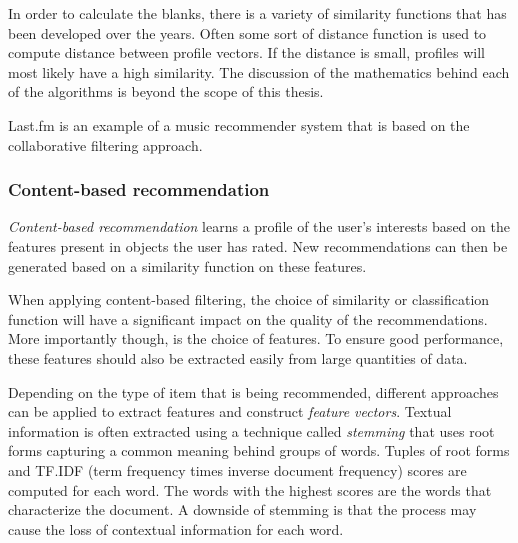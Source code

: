 In order to calculate the blanks, there is a variety of similarity functions that has been developed over the years. Often some sort of distance function is used to compute distance between profile vectors. If the distance is small, profiles will most likely have a high similarity\cite{rajaraman:2012}. The discussion of the mathematics behind each of the algorithms is beyond the scope of this thesis.

Last.fm is an example of a music recommender system that is based on the collaborative filtering approach\cite{levy:2010}.


\subsubsection{Content-based recommendation}\label{chapter:literature_study:section:computer:subsection:algorithms:subsubsection:cbf}

\emph{Content-based recommendation} learns a profile of the user's interests based on the features present in objects the user has rated. New recommendations can then be generated based on a similarity function on these features\cite{burke:2002, pazzani:2007:CRS:1768197.1768209}.

When applying content-based filtering, the choice of similarity or classification function will have a significant impact on the quality of the recommendations. More importantly though, is the choice of features. To ensure good performance, these features should also be extracted easily from large quantities of data.

Depending on the type of item that is being recommended, different approaches can be applied to extract features and construct \emph{feature vectors}. Textual information is often extracted using a technique called \emph{stemming} that uses root forms capturing a common meaning behind groups of words. Tuples of root forms and TF.IDF (term frequency times inverse document frequency)  scores are computed for each word\cite{pazzani:2007:CRS:1768197.1768209, rajaraman:2012}. The words with the highest scores are the words that characterize the document\cite{rajaraman:2012}. A downside of stemming is that the process may cause the loss of contextual information for each word\cite{pazzani:2007:CRS:1768197.1768209}.

